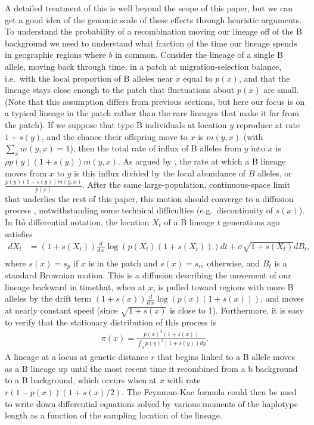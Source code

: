 \documentclass{article}
\begin{document}
A detailed treatment of this is well beyond the scope of this paper,
but we can get a good idea of the genomic scale of these effects through heuristic arguments.
To understand the probability of a recombination moving our lineage
off of the B background we need to understand what fraction of the
time our lineage spends in geographic regions where $b$ in common. 
Consider the lineage of a single B allele, moving back through time,
in a patch at migration-selection balance, 
i.e.\ with the local proportion of B alleles near $x$ equal to $p(x)$,
and that the lineage stays close enough to the patch 
that fluctuations about $p(x)$ are small. (Note that this assumption differs from
previous sections, but here our focus is on a typical lineage in the
patch rather than the rare lineages that make it far from the patch).
If we suppose that type B individuals at location $y$ reproduce at rate $1+s(y)$,
and the chance their offspring move to $x$ is $m(y,x)$ (with $\sum_x m(y,x)=1$),
then the total rate of influx of B alleles from $y$ into $x$ is $\rho p(y) (1+s(y)) m(y,x)$.
As argued by \citet{hudson}, the rate at which a B lineage moves from $x$ to $y$
is this influx divided by the local abundance of $B$ alleles,
or $\frac{ p(y) (1+s(y)) m(y,x) }{ p(x) }$.
After the same large-population, continuous-space limit that underlies the rest of this paper,
this motion should converge to a diffusion process \citep[as assumed by][]{hallatschek},
notwithstanding some technical difficulties (e.g.\ discontinuity of $s(x)$).
In It\^o differential notation, 
the location $X_t$ of a B lineage $t$ generations ago satisfies
\begin{align}
    d X_t &= (1+s(X_t)) \frac{d}{d\,x} \log( p(X_t) (1+s(X_t)) ) dt + \sigma \sqrt{1+s(X_t)} dB_t,\\
\end{align}
where $s(x)=s_p$ if $x$ is in the patch and $s(x)=s_m$ otherwise, 
and $B_t$ is a standard Brownian motion.
This is a diffusion describing the movement of our lineage backward in
timethat, when at $x$, 
is pulled toward regions with more B alleles
by the drift term $(1+s(x))\frac{d}{d\,x} \log( p(x) (1+s(x)) )$,
and moves at nearly constant speed (since $\sqrt{1+s(x)}$ is close to 1).
Furthermore, it is easy to verify that the stationary distribution of this process is
\begin{align}
  \pi(x) = \frac{ p(x)^2 (1+s(x)) }{ \int_y p(y)^2 (1+s(y)) dy } . \label{eqn:lineagestatdist}
\end{align}
A lineage at a locus at genetic distance $r$ that begins linked to a B allele
moves as a B lineage up until the most recent time
it recombined from a b background to a B background,
which occurs when at $x$ with rate $r (1-p(x)) (1+s(x)/2)$.
The Feynman-Kac formula could then be used to write down differential equations
solved by various moments of the haplotype length as a function of the sampling location of the lineage.
\end{document}

